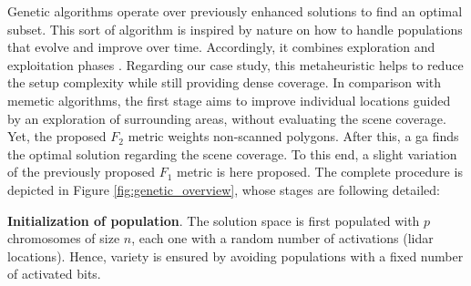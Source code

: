 Genetic algorithms operate over previously enhanced solutions to find an optimal subset. This sort of algorithm is inspired by nature on how to handle populations that evolve and improve over time. Accordingly, it combines exploration and exploitation phases \cite{vannucci_genetic_2020}. Regarding our case study, this metaheuristic helps to reduce the setup complexity while still providing dense coverage. In comparison with memetic algorithms, the first stage aims to improve individual locations guided by an exploration of surrounding areas, without evaluating the scene coverage. Yet, the proposed $F_2$ metric weights non-scanned polygons. After this, a \acrshort{ga} finds the optimal solution regarding the scene coverage. To this end, a slight variation of the previously proposed $F_1$ metric is here proposed. The complete procedure is depicted in Figure \ref{fig:genetic_overview}, whose stages are following detailed:

\textbf{Initialization of population}. The solution space is first populated with $p$ chromosomes of size $n$, each one with a random number of activations (\acrshort{lidar} locations). Hence, variety is ensured by avoiding populations with a fixed number of activated bits.

